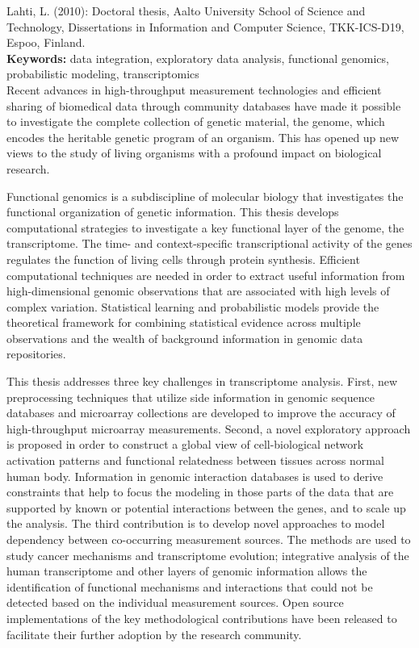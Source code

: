 \thispagestyle{empty}
\vspace{0.5cm}

\noindent Lahti, L. (2010):  Doctoral thesis, Aalto
University School of Science and Technology, Dissertations in
Information and Computer Science, TKK-ICS-D19, Espoo, Finland.\\%

\noindent \textbf{Keywords:} data integration, exploratory data
analysis, functional genomics, probabilistic modeling,
transcriptomics\\

Recent advances in high-throughput measurement technologies and
efficient sharing of biomedical data through community databases have
made it possible to investigate the complete collection of genetic
material, the genome, which encodes the heritable genetic program of an
organism. This has opened up new views to the study of living
organisms with a profound impact on biological research.

Functional genomics is a subdiscipline of molecular biology that
investigates the functional organization of genetic information.  This
thesis develops computational strategies to investigate a key
functional layer of the genome, the transcriptome. The time- and
context-specific transcriptional activity of the genes regulates the
function of living cells through protein synthesis. Efficient
computational techniques are needed in order to extract useful
information from high-dimensional genomic observations that are
associated with high levels of complex variation. Statistical learning
and probabilistic models provide the theoretical framework for
combining statistical evidence across multiple observations and the
wealth of background information in genomic data repositories.

This thesis addresses three key challenges in transcriptome
analysis. First, new preprocessing techniques that utilize side
information in genomic sequence databases and microarray collections
are developed to improve the accuracy of high-throughput microarray
measurements.  Second, a novel exploratory approach is proposed in
order to construct a global view of cell-biological network activation
patterns and functional relatedness between tissues across normal
human body. Information in genomic interaction databases is used to
derive constraints that help to focus the modeling in those parts of
the data that are supported by known or potential interactions between
the genes, and to scale up the analysis. The third contribution is to
develop novel approaches to model dependency between co-occurring
measurement sources. The methods are used to study cancer mechanisms
and transcriptome evolution; integrative analysis of the human
transcriptome and other layers of genomic information allows the
identification of functional mechanisms and interactions that could
not be detected based on the individual measurement sources. Open
source implementations of the key methodological contributions have
been released to facilitate their further adoption by the research
community.

